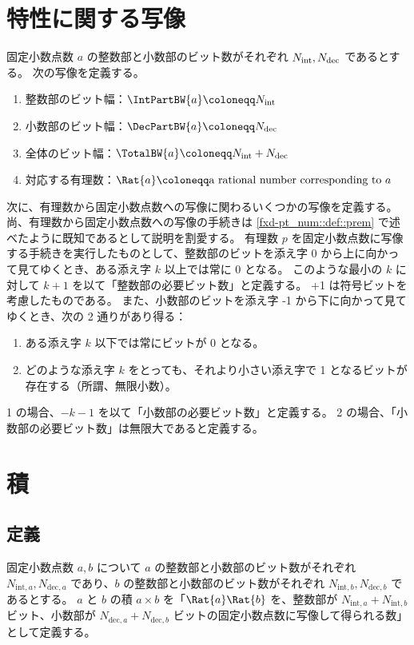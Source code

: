     \section{特性に関する写像}
        固定小数点数 $a$ の整数部と小数部のビット数がそれぞれ ${N_\text{int}}, {N_\text{dec}}$ であるとする。
        次の写像を定義する。
        \begin{enumerate}
            \item 整数部のビット幅：$\IntPartBW{a} \coloneqq \Ni$
            \item 小数部のビット幅：$\DecPartBW{a} \coloneqq \Nd$
            \item 全体のビット幅：$\TotalBW{a} \coloneqq \Ni + \Nd$
            \item 対応する有理数：$\Rat{a} \coloneqq \text{a rational number corresponding to }a$
        \end{enumerate}
        次に、有理数から固定小数点数への写像に関わるいくつかの写像を定義する。
        尚、有理数から固定小数点数への写像の手続きは \ref{fxd-pt_num::def::prem} で述べたように既知であるとして説明を割愛する。
        有理数 $p$ を固定小数点数に写像する手続きを実行したものとして、整数部のビットを添え字 0 から上に向かって見てゆくとき、ある添え字 $k$ 以上では常に 0 となる。
        このような最小の $k$ に対して $k+1$ を以て「整数部の必要ビット数」と定義する。
        +1 は符号ビットを考慮したものである。
        また、小数部のビットを添え字 -1 から下に向かって見てゆくとき、次の 2 通りがあり得る：
        \begin{enumerate}
            \item ある添え字 $k$ 以下では常にビットが 0 となる。
            \item どのような添え字 $k$ をとっても、それより小さい添え字で 1 となるビットが存在する（所謂、無限小数）。
        \end{enumerate}
        1 の場合、$-k-1$ を以て「小数部の必要ビット数」と定義する。
        2 の場合、「小数部の必要ビット数」は無限大であると定義する。
    \section{積}
        \newcommand{\Nia}{{N_{\text{int},a}}}
        \newcommand{\Nda}{{N_{\text{dec},a}}}
        \newcommand{\Nib}{{N_{\text{int},b}}}
        \newcommand{\Ndb}{{N_{\text{dec},b}}}
        \subsection{定義}
            固定小数点数 $a, b$ について $a$ の整数部と小数部のビット数がそれぞれ $\Nia, \Nda$ であり、$b$ の整数部と小数部のビット数がそれぞれ $\Nib, \Ndb$ であるとする。
            $a$ と $b$ の積 $a\times b$ を「$\Rat{a}\Rat{b}$ を、整数部が $\Nia+\Nib$ ビット、小数部が $\Nda+\Ndb$ ビットの固定小数点数に写像して得られる数」として定義する。
            \par
